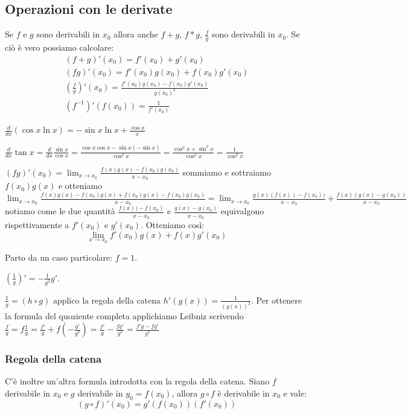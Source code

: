 \subsection{Operazioni con le derivate}
    Se $f$ e $g$ sono derivabili in $x_0$ allora anche $f+g$, $f*g$, $\frac{f}{g}$ sono derivabili in $x_0$. Se ciò è vero possiamo calcolare:
    \begin{align}
        (f+g)'(x_0)=f'(x_0)+g'(x_0)\\
        (fg)'(x_0)=f'(x_0)g(x_0)+f(x_0)g'(x_0)\\
        (\frac{f}{g})'(x_0)=\frac{f'(x_0)g(x_0)-f(x_0)g'(x_0)}{g(x_0)^2}\\
        (f^{-1})'(f(x_0))=\frac{1}{f'(x_0)}
    \end{align}
    \begin{example}
        $\frac{d}{dx}(\cos{x}\ln{x})=-\sin{x}\ln{x}+\frac{\cos{x}}{x}$
        
        $\frac{d}{dx}\tan{x}=\frac{d}{dx}\frac{\sin{x}}{\cos{x}}=\frac{\cos{x}\cos{x}-\sin{x}(-\sin{x})}{\cos^2{x}}=\frac{\cos^2{x}+\sin^2{x}}{\cos^2{x}}=\frac{1}{\cos^2{x}}$
    \end{example}
    \begin{dimostration}
        $(fg)'(x_0)=\lim_{x\to x_0}\frac{f(x)g(x)-f(x_0)g(x_0)}{x-x_0}$ sommiamo e sottraiamo $f(x_0)g(x)$ e otteniamo $\lim_{x\to x_0}\frac{f(x)g(x)-f(x_0)g(x)+f(x_0)g(x)-f(x_0)g(x_0)}{x-x_0}=\lim_{x\to x_0}\frac{g(x)(f(x))-f(x_0))}{x-x_0}+\frac{f(x)(g(x)-g(x_0))}{x-x_0}$ notiamo come le due quantità $\frac{f(x))-f(x_0)}{x-x_0}$ e $\frac{g(x)-g(x_0)}{x-x_0}$ equivalgono rispettivamente a $f'(x_0)$ e $g'(x_0)$. Otteniamo così:
        \begin{equation*}
            \lim_{x\to x_0}f'(x_0)g(x)+f(x)g'(x_0)
        \end{equation*}
    \end{dimostration}
\begin{dimostration}
    Parto da un caso particolare: $f=1$.
    
    $(\frac{1}{g})'=-\frac{1}{g^2}g'$.
    
    $\frac{1}{g}=(h\circ g)$ applico la regola della catena $h'(g(x))=\frac{1}{(g(x))^2}$. Per ottenere la formula del quoziente completa applichiamo Leibniz scrivendo $\frac{f}{g}=f\frac{1}{g}=\frac{f'}{g}+f(-\frac{g'}{g^2})=\frac{f'}{g}-\frac{fg'}{g^2}=\frac{f'g-fg'}{g^2}$
\end{dimostration}


\subsubsection*{Regola della catena}
C'è inoltre un'altra formula introdotta con la regola della catena.
Siano $f$ derivabile in $x_0$ e $g$ derivabile in $y_0=f(x_0)$, allora $g\circ f$ è derivabile in $x_0$ e vale:
\begin{equation}
    (g\circ f)'(x_0)=g'(f(x_0))(f'(x_0))
\end{equation}

